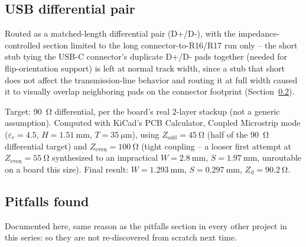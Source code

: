 \documentclass[11pt]{article}
\begin{document}
\subsection{USB differential pair}

Routed as a matched-length differential pair (D+/D-), with the impedance-controlled section limited
to the long connector-to-R16/R17 run only -- the short stub tying the USB-C connector's duplicate
D+/D- pads together (needed for flip-orientation support) is left at normal track width, since a
stub that short does not affect the transmission-line behavior and routing it at full width caused
it to visually overlap neighboring pads on the connector footprint (Section~\ref{sec:pitfalls}).

Target: \SI{90}{\ohm} differential, per the board's real 2-layer stackup (not a generic assumption).
Computed with KiCad's PCB Calculator, Coupled Microstrip mode ($\varepsilon_r = 4.5$,
$H = \SI{1.51}{\milli\meter}$, $T = \SI{35}{\micro\meter}$), using $Z_\text{odd} = \SI{45}{\ohm}$
(half of the \SI{90}{\ohm} differential target) and $Z_\text{even} = \SI{100}{\ohm}$ (tight coupling
-- a looser first attempt at $Z_\text{even}=\SI{55}{\ohm}$ synthesized to an impractical
$W=\SI{2.8}{\milli\meter}$, $S=\SI{1.97}{\milli\meter}$, unroutable on a board this size). Final
result: $W = \SI{1.293}{\milli\meter}$, $S = \SI{0.297}{\milli\meter}$,
$Z_\text{d} = \SI{90.2}{\ohm}$.

\subsection{Pitfalls found}
\label{sec:pitfalls}

Documented here, same reason as the pitfalls section in every other project in this series: so they
are not re-discovered from scratch next time.
\end{document}
